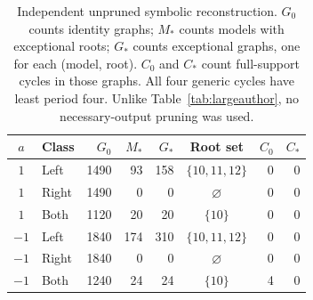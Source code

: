 \begin{table}[tb]
\centering
\caption{Independent unpruned symbolic reconstruction. $G_0$ counts
identity graphs; $M_*$ counts models with exceptional roots; $G_*$
counts exceptional graphs, one for each (model, root). $C_0$ and
$C_*$ count full-support cycles in those graphs. All four generic
cycles have least period four. Unlike Table~\ref{tab:largeauthor},
no necessary-output pruning was used.}
\label{tab:largeindependent}
\small
\begin{tabular}{@{}clrrrcrr@{}}
\toprule
$a$ & Class & $G_0$ & $M_*$ & $G_*$ & Root set & $C_0$ & $C_*$\\
\midrule
$1$ & Left & 1490 & 93 & 158 & $\{10,11,12\}$ & 0 & 0\\
$1$ & Right & 1490 & 0 & 0 & $\varnothing$ & 0 & 0\\
$1$ & Both & 1120 & 20 & 20 & $\{10\}$ & 0 & 0\\
$-1$ & Left & 1840 & 174 & 310 & $\{10,11,12\}$ & 0 & 0\\
$-1$ & Right & 1840 & 0 & 0 & $\varnothing$ & 0 & 0\\
$-1$ & Both & 1240 & 24 & 24 & $\{10\}$ & 4 & 0\\
\bottomrule
\end{tabular}
\end{table}
